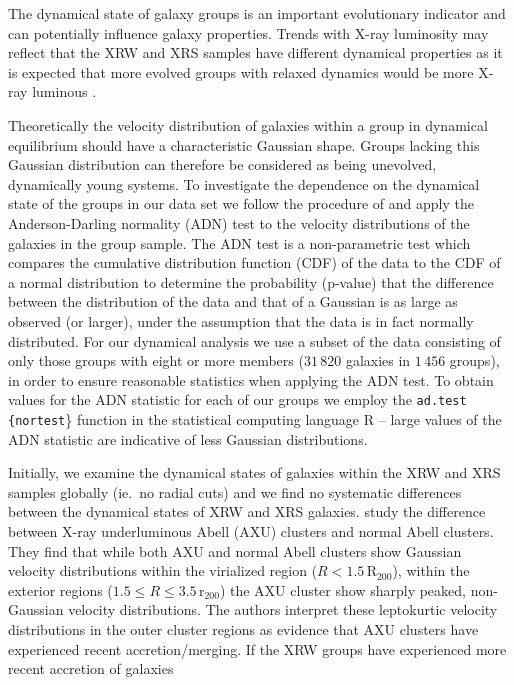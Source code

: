 The dynamical state of galaxy groups is an important evolutionary
indicator and can potentially influence galaxy properties.  Trends
with X-ray luminosity may reflect that the XRW and XRS samples have
different dynamical properties as it is expected that more evolved
groups with relaxed dynamics would be more X-ray luminous
\citep{popesso2007a}.
\par
Theoretically the velocity distribution of galaxies within a group in
dynamical equilibrium should have a characteristic Gaussian shape.
Groups lacking this Gaussian distribution can therefore be considered
as being unevolved, dynamically young systems.  To investigate the
dependence on the dynamical state of the groups in our data set we
follow the procedure of \citet{hou2009} and apply the Anderson-Darling
normality (ADN) test to the velocity distributions of the galaxies in
the group sample.  The ADN test is a non-parametric test which
compares the cumulative distribution function (CDF) of the data to the
CDF of a normal distribution to determine the probability (p-value)
that the difference between the distribution of the data and that of a
Gaussian is as large as observed (or larger), under the assumption
that the data is in fact normally distributed.  For our dynamical
analysis we use a subset of the data consisting of only those groups
with eight or more members ($31\,820$ galaxies in $1\,456$ groups), in
order to ensure reasonable statistics when applying the ADN test.  To
obtain values for the ADN statistic for each of our groups we employ
the \texttt{ad.test \{nortest}\} function in the statistical computing
language \textsc{R} \citep{r2013} -- large values of the ADN statistic
are indicative of less Gaussian distributions.
\par
Initially, we examine the dynamical states of galaxies within the XRW
and XRS samples globally (ie.\ no radial cuts) and we find no
systematic differences between the dynamical states of XRW and XRS
galaxies.  \citet{popesso2007a} study the difference between X-ray
underluminous Abell (AXU) clusters and normal Abell clusters.  They
find that while both AXU and normal Abell clusters show Gaussian
velocity distributions within the virialized region ($R <
1.5\,\mathrm{R_{200}}$), within the exterior regions ($1.5 \le R \le
3.5\,\mathrm{r_{200}}$) the AXU cluster show sharply peaked,
non-Gaussian velocity distributions.  The authors interpret these
leptokurtic velocity distributions in the outer cluster regions as
evidence that AXU clusters have experienced recent accretion/merging.
If the XRW groups have experienced more recent accretion of galaxies
